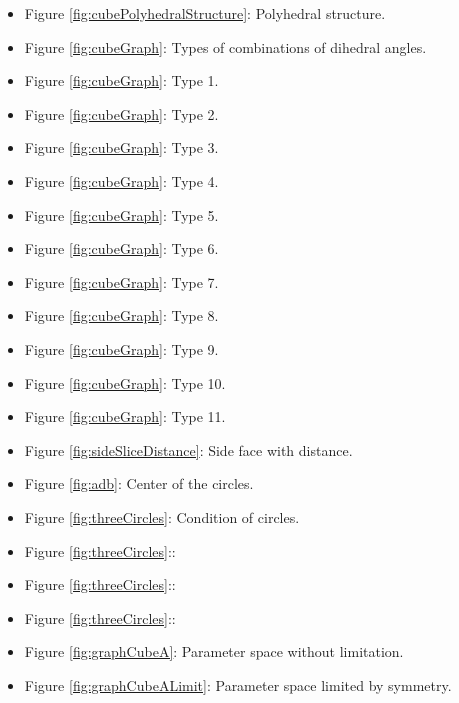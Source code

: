 \documentclass[suppldata, dvipdfmx]{interact}
\theoremstyle{plain}%
\theoremstyle{definition}
\theoremstyle{remark}
\theoremstyle{problemstyle}
\begin{document}
\begin{itemize}
\item Figure \ref{fig:cubePolyhedralStructure}: Polyhedral structure.
\item Figure \ref{fig:cubeGraph}: Types of combinations of dihedral
      angles.
\item Figure \ref{fig:cubeGraph}: Type 1.
\item Figure \ref{fig:cubeGraph}: Type 2.
\item Figure \ref{fig:cubeGraph}: Type 3.
\item Figure \ref{fig:cubeGraph}: Type 4.
\item Figure \ref{fig:cubeGraph}: Type 5.
\item Figure \ref{fig:cubeGraph}: Type 6.
\item Figure \ref{fig:cubeGraph}: Type 7.
\item Figure \ref{fig:cubeGraph}: Type 8.
\item Figure \ref{fig:cubeGraph}: Type 9.
\item Figure \ref{fig:cubeGraph}: Type 10.
\item Figure \ref{fig:cubeGraph}: Type 11.


\item Figure \ref{fig:sideSliceDistance}: Side face with distance.
\item Figure \ref{fig:adb}: Center of the circles.

\item Figure \ref{fig:threeCircles}: Condition of circles.
\item Figure \ref{fig:threeCircles}::
\item Figure \ref{fig:threeCircles}::
\item Figure \ref{fig:threeCircles}::

\item Figure \ref{fig:graphCubeA}: Parameter space without limitation.
\item Figure \ref{fig:graphCubeALimit}: Parameter space limited by symmetry.


\end{itemize}
\end{document}
